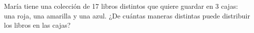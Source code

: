 \begin{enunciado}{\ejercicio}
  María tiene una colección de 17 libros distintos que quiere guardar en 3 cajas:
  una roja, una amarilla y una azul.
  ¿De cuántas maneras distintas puede distribuir los libros en las cajas?
\end{enunciado}

\hacer
